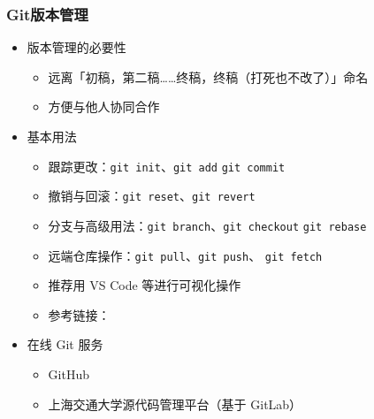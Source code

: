 \begin{frame}[fragile]
  \frametitle{Git版本管理}
  \begin{itemize}
    \item 版本管理的必要性
          \begin{itemize}
            \item 远离「初稿，第二稿……终稿，终稿（打死也不改了）」命名
            \item 方便与他人协同合作
          \end{itemize}
    \item 基本用法
          \begin{itemize}
            \item 跟踪更改：\verb|git init|、\verb|git add|
                  \verb|git commit|
            \item 撤销与回滚：\verb|git reset|、\verb|git revert|
            \item 分支与高级用法：\verb|git branch|、\verb|git checkout|
                  \verb|git rebase|
            \item 远端仓库操作：\verb|git pull|、\verb|git push|、
                  \verb|git fetch|
            \item 推荐用 VS Code 等进行可视化操作
            \item 参考链接：
          \end{itemize}
    \item 在线 Git 服务
          \begin{itemize}
            \item GitHub \href{https://github.com}{\faGithub}
            \item 上海交通大学源代码管理平台（基于 GitLab）
          \end{itemize}
  \end{itemize}
\end{frame}

